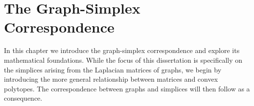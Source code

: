 \chapter{The Graph-Simplex Correspondence}
\label{chap:correspondence}



In this chapter we introduce the graph-simplex correspondence and explore its mathematical foundations. While the focus of this dissertation is specifically on  the simplices  arising from the Laplacian  matrices of graphs, we begin by introducing the more general relationship between matrices and convex polytopes. The correspondence between graphs and simplices will then follow as a consequence. 



